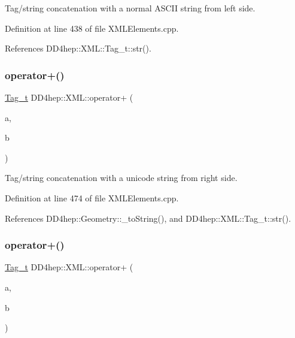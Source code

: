 Tag/string concatenation with a normal A\+S\+C\+II string from left side. 



Definition at line 438 of file X\+M\+L\+Elements.\+cpp.



References D\+D4hep\+::\+X\+M\+L\+::\+Tag\+\_\+t\+::str().

\hypertarget{group___d_d4_h_e_p___x_m_l_ga658bb45f4c5cc614a2508957b27c0bd7}{}\label{group___d_d4_h_e_p___x_m_l_ga658bb45f4c5cc614a2508957b27c0bd7} 
\subsubsection{\texorpdfstring{operator+()}{operator+()}\hspace{0.1cm}{\footnotesize\ttfamily [12/14]}}
{\footnotesize\ttfamily \hyperlink{class_d_d4hep_1_1_x_m_l_1_1_tag__t}{Tag\+\_\+t} D\+D4hep\+::\+X\+M\+L\+::operator+ (\begin{DoxyParamCaption}\item[{const \hyperlink{class_d_d4hep_1_1_x_m_l_1_1_tag__t}{Tag\+\_\+t} \&}]{a,  }\item[{const \hyperlink{namespace_d_d4hep_1_1_x_m_l_a09e5d9cc86ed782f6826dfe0778c1815}{Xml\+Char} $\ast$}]{b }\end{DoxyParamCaption})}



Tag/string concatenation with a unicode string from right side. 



Definition at line 474 of file X\+M\+L\+Elements.\+cpp.



References D\+D4hep\+::\+Geometry\+::\+\_\+to\+String(), and D\+D4hep\+::\+X\+M\+L\+::\+Tag\+\_\+t\+::str().

\hypertarget{group___d_d4_h_e_p___x_m_l_ga64cd4f3e74d5147d8a0dda8d7dc5b372}{}\label{group___d_d4_h_e_p___x_m_l_ga64cd4f3e74d5147d8a0dda8d7dc5b372} 
\subsubsection{\texorpdfstring{operator+()}{operator+()}\hspace{0.1cm}{\footnotesize\ttfamily [13/14]}}
{\footnotesize\ttfamily \hyperlink{class_d_d4hep_1_1_x_m_l_1_1_tag__t}{Tag\+\_\+t} D\+D4hep\+::\+X\+M\+L\+::operator+ (\begin{DoxyParamCaption}\item[{const \hyperlink{class_d_d4hep_1_1_x_m_l_1_1_tag__t}{Tag\+\_\+t} \&}]{a,  }\item[{const \hyperlink{class_d_d4hep_1_1_x_m_l_1_1_strng__t}{Strng\+\_\+t} \&}]{b }\end{DoxyParamCaption})}



